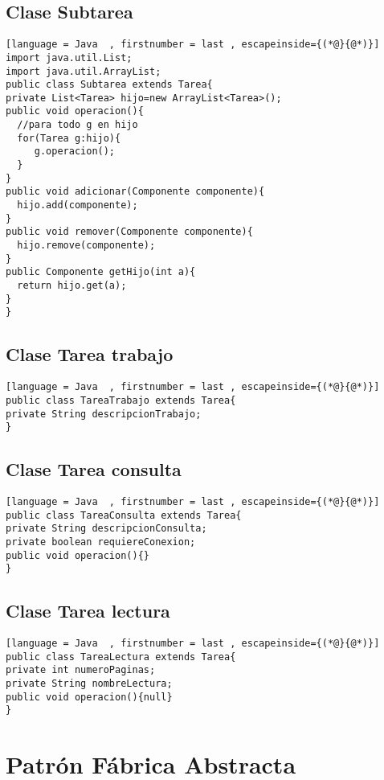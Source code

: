 \subsection{Clase Subtarea}
\begin{lstlisting}[language = Java  , firstnumber = last , escapeinside={(*@}{@*)}]
import java.util.List;
import java.util.ArrayList;
public class Subtarea extends Tarea{
private List<Tarea> hijo=new ArrayList<Tarea>();
public void operacion(){
  //para todo g en hijo
  for(Tarea g:hijo){
     g.operacion();
  }
}
public void adicionar(Componente componente){
  hijo.add(componente);
}
public void remover(Componente componente){
  hijo.remove(componente);
}
public Componente getHijo(int a){
  return hijo.get(a);
}
}
\end{lstlisting}

\subsection{Clase Tarea trabajo}
\begin{lstlisting}[language = Java  , firstnumber = last , escapeinside={(*@}{@*)}]
public class TareaTrabajo extends Tarea{
private String descripcionTrabajo;
}
\end{lstlisting}

\subsection{Clase Tarea consulta}
\begin{lstlisting}[language = Java  , firstnumber = last , escapeinside={(*@}{@*)}]
public class TareaConsulta extends Tarea{
private String descripcionConsulta;
private boolean requiereConexion;
public void operacion(){}
}
\end{lstlisting}

\subsection{Clase Tarea lectura}
\begin{lstlisting}[language = Java  , firstnumber = last , escapeinside={(*@}{@*)}]
public class TareaLectura extends Tarea{
private int numeroPaginas;
private String nombreLectura;
public void operacion(){null}
}
\end{lstlisting}

\section{Patrón Fábrica Abstracta}

